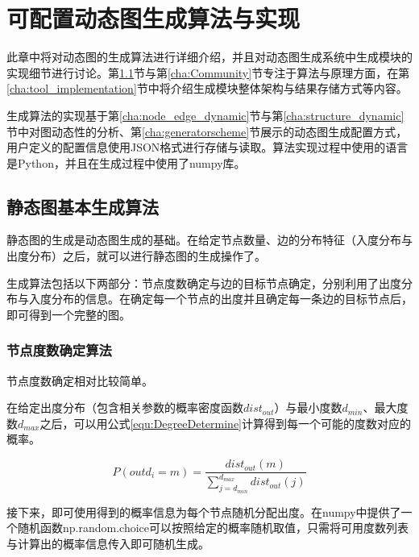 
\chapter{可配置动态图生成算法与实现}
\label{cha:chapter03}

此章中将对动态图的生成算法进行详细介绍，并且对动态图生成系统中生成模块的实现细节进行讨论。第\ref{cha:staticgraph}节与第\ref{cha:Community}节专注于算法与原理方面，在第\ref{cha:tool_implementation}节中将介绍生成模块整体架构与结果存储方式等内容。

生成算法的实现基于第\ref{cha:node_edge_dynamic}节与第\ref{cha:structure_dynamic}节中对图动态性的分析、第\ref{cha:generatorscheme}节展示的动态图生成配置方式，用户定义的配置信息使用JSON格式进行存储与读取。算法实现过程中使用的语言是Python，并且在生成过程中使用了numpy库。

\section{静态图基本生成算法}
\label{cha:staticgraph}

静态图的生成是动态图生成的基础。在给定节点数量、边的分布特征（入度分布与出度分布）之后，就可以进行静态图的生成操作了。

生成算法包括以下两部分：节点度数确定与边的目标节点确定\cite{FastSGG}，分别利用了出度分布与入度分布的信息。在确定每一个节点的出度并且确定每一条边的目标节点后，即可得到一个完整的图。

\subsection{节点度数确定算法}

节点度数确定相对比较简单。

在给定出度分布（包含相关参数的概率密度函数$dist_{out}$）与最小度数$d_{min}$、最大度数$d_{max}$之后，可以用公式\ref{equ:DegreeDetermine}计算得到每一个可能的度数对应的概率。

\vspace{-8mm}

\begin{equation}
  \label{equ:DegreeDetermine}
  P\left(outd_i=m\right)=\frac{dist_{out}(m)}{\sum\limits_{j=d_{min}}^{d_{max}}dist_{out}(j)}
\end{equation}

接下来，即可使用得到的概率信息为每个节点随机分配出度。在numpy中提供了一个随机函数np.random.choice可以按照给定的概率随机取值，只需将可用度数列表与计算出的概率信息传入即可随机生成。

